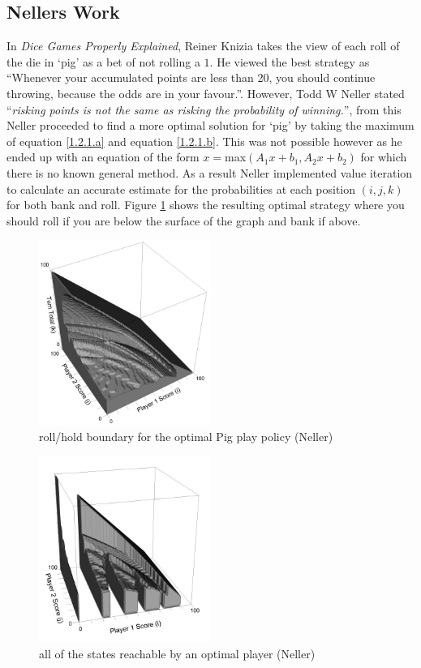 \documentclass[a4paper,titlepage]{article}
\begin{document}
\subsection{Nellers Work}
In \textit{Dice Games Properly Explained}, Reiner Knizia takes the view of each roll of the die in `pig' as a bet of not rolling a $1$.
He viewed the best strategy as ``Whenever your accumulated points are less than 20, you should continue throwing, because the odds are in your favour.''\cite{knizia2010dice}.
However, Todd W Neller stated ``\textit{risking points is not the same as risking the probability of winning.}''\cite{neller2004optimal},
from this Neller proceeded to find a more optimal solution for `pig' by taking the maximum of equation \ref{1.2.1.a} and equation \ref{1.2.1.b}.
This was not possible however as he ended up with an equation of the form $x=$max$ (A_1 x+b_1,A_2 x+b_2)$ for which there is no known general method.
As a result Neller implemented value iteration to calculate an accurate estimate for the probabilities at each position $(i,j,k)$ for both bank and roll.
Figure \ref{figure1} shows the resulting optimal strategy where you should roll if you are below the surface of the graph and bank if above.

\begin{figure}
\centering
\includegraphics[width=0.5\textwidth]{neller_optimal_solution}
\caption{roll\slash hold boundary for the optimal Pig play policy (Neller)\label{figure1}}
\end{figure}
\begin{figure}
\centering
\includegraphics[width=0.5\textwidth]{neller_optimal_solution_2}
\caption{all of the states reachable by an optimal player (Neller)\label{figure2}}
\end{figure}
\end{document}
